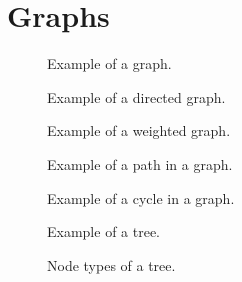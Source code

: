 \section{Graphs}

\begin{figure}[tbp]
  
  \caption{Example of a graph.}
  \label{fig:bs:graphs:graph}
\end{figure}

\begin{figure}[tbp]
  
  \caption{Example of a directed graph.}
  \label{fig:bs:graphs:directed}
\end{figure}

\begin{figure}[tbp]
  
  \caption{Example of a weighted graph.}
  \label{fig:bs:graphs:weighted}
\end{figure}

\begin{figure}[tbp]
  
  \caption{Example of a path in a graph.}
  \label{fig:bs:graphs:path}
\end{figure}

\begin{figure}[tbp]
  
  \caption{Example of a cycle in a graph.}
  \label{fig:bs:graphs:cycle}
\end{figure}

\begin{figure}[tbp]
  
  \caption{Example of a tree.}
  \label{fig:bs:graphs:trees}
\end{figure}

\begin{figure}[tbp]
  
  \caption{Node types of a tree.}
  \label{fig:bs:graphs:trees:nodetypes}
\end{figure}

